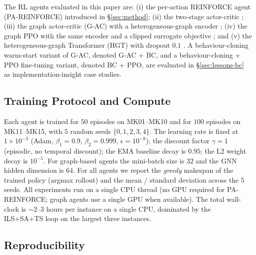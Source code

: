 \documentclass[10pt]{article}
\theoremstyle{definition}
\begin{document}
The RL agents evaluated in this paper are: (i) the
per-action REINFORCE agent (PA-REINFORCE) introduced in
\S\ref{sec:method}; (ii) the two-stage actor-critic
\citep[TA-AC, see][]{Mnih2016}; (iii) the graph
actor-critic (G-AC) with a heterogeneous-graph encoder
\citep{Song2022TII}; (iv) the graph PPO with the same
encoder and a clipped surrogate objective
\citep{Schulman2017PPO}; and (v) the heterogeneous-graph
Transformer (HGT) with dropout $0.1$ \citep{Hu2020HGT}.
A behaviour-cloning warm-start variant of G-AC, denoted
G-AC + BC, and a behaviour-cloning + PPO fine-tuning
variant, denoted BC + PPO, are evaluated in
\S\ref{sec:lessons-bc} as implementation-insight case studies.

\subsection{Training Protocol and Compute}

Each agent is trained for $50$ episodes on
MK01--MK10 and for $100$ episodes on MK11--MK15, with
$5$ random seeds $\{0, 1, 2, 3, 4\}$. The learning rate
is fixed at $1 \times 10^{-3}$ (Adam, $\beta_1 = 0.9$,
$\beta_2 = 0.999$, $\epsilon = 10^{-8}$); the discount
factor $\gamma = 1$ (episodic, no temporal discount);
the EMA baseline decay is $0.95$; the L2 weight decay is
$10^{-5}$. For graph-based agents the mini-batch size is
$32$ and the GNN hidden dimension is $64$. For all
agents we report the \emph{greedy} makespan of the
trained policy (argmax rollout) and the
mean / standard deviation across the $5$ seeds. All
experiments run on a single CPU thread (no GPU required
for PA-REINFORCE; graph agents use a single GPU when
available). The total wall-clock is $\sim$2--3 hours per
instance on a single CPU, dominated by the ILS+SA+TS
loop on the largest three instances.

\subsection{Reproducibility}
\end{document}
